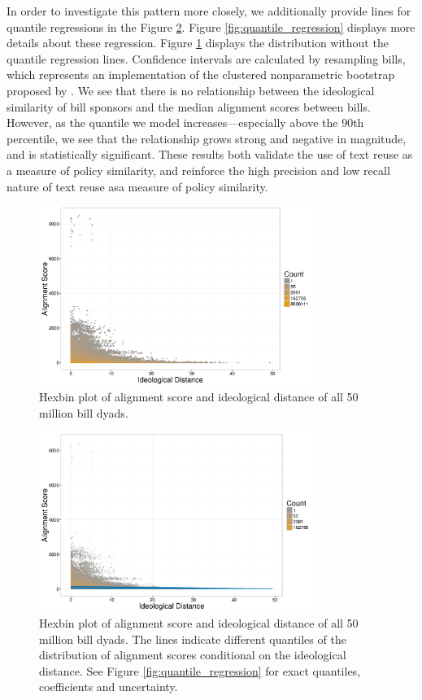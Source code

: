 \documentclass[12pt]{article} %
\begin{document}
In order to investigate this pattern more closely, we additionally provide lines for quantile regressions in the Figure \ref{fig:ideology_quantile_plot}. Figure \ref{fig:quantile_regression} displays more details about these regression. Figure \ref{fig:ideology_plot} displays the distribution without the quantile regression lines. Confidence intervals are calculated by resampling bills, which represents an implementation of the clustered nonparametric bootstrap proposed by \citet{harden2011bootstrap}. We see that there is no relationship between the ideological similarity of bill sponsors and the median alignment scores between bills. However, as the quantile we model increases---especially above the 90th percentile, we see that the relationship grows strong and negative in magnitude, and is statistically significant. These results both validate the use of text reuse as a measure of policy similarity, and reinforce the high precision and low recall nature of text reuse asa measure of policy similarity.


\begin{figure}[ht!]
    \centering
    \includegraphics[width=0.8\textwidth]{figures/ideology_plot.png}
    \caption{Hexbin plot of alignment score and ideological distance of all 50 million bill dyads.}
    \label{fig:ideology_plot}
\end{figure}

\begin{figure}[ht!]
    \centering
    \includegraphics[width=0.8\textwidth]{figures/ideology_quantile_plot.png}
    \caption{Hexbin plot of alignment score and ideological distance of all 50 million bill dyads. The lines indicate different quantiles of the distribution of alignment scores conditional on the ideological distance. See Figure \ref{fig:quantile_regression} for exact quantiles, coefficients and uncertainty.}
    \label{fig:ideology_quantile_plot}
\end{figure}
\end{document}
